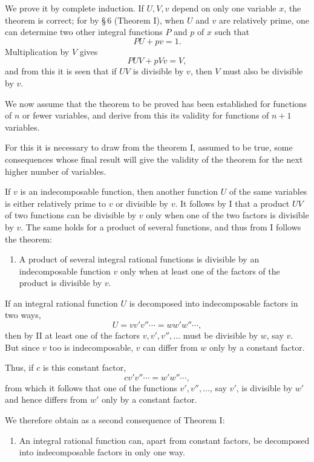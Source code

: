 \documentclass[11pt]{article}
\begin{document}
We prove it by complete induction. If $U,V,v$ depend on only one variable $x$, the theorem is correct; for by \S\,6 (Theorem I), when $U$ and $v$ are relatively prime, one can determine two other integral functions $P$ and $p$ of $x$ such that
\[
PU+pv=1.
\]
Multiplication by $V$ gives
\[
PUV+pVv=V,
\]
and from this it is seen that if $UV$ is divisible by $v$, then $V$ must also be divisible by $v$.

We now assume that the theorem to be proved has been established for functions of $n$ or fewer variables, and derive from this its validity for functions of $n+1$ variables.

For this it is necessary to draw from the theorem I, assumed to be true, some consequences whose final result will give the validity of the theorem for the next higher number of variables.

If $v$ is an indecomposable function, then another function $U$ of the same variables is either relatively prime to $v$ or divisible by $v$. It follows by I that a product $UV$ of two functions can be divisible by $v$ only when one of the two factors is divisible by $v$. The same holds for a product of several functions, and thus from I follows the theorem:

\begin{enumerate}[label=\Roman*.,leftmargin=2.4em,start=2]
\item A product of several integral rational functions is divisible by an indecomposable function $v$ only when at least one of the factors of the product is divisible by $v$.
\end{enumerate}

If an integral rational function $U$ is decomposed into indecomposable factors in two ways,
\[
U=vv'v''\cdots=ww'w''\cdots,
\]
then by II at least one of the factors $v,v',v'',\ldots$ must be divisible by $w$, say $v$. But since $v$ too is indecomposable, $v$ can differ from $w$ only by a constant factor.

Thus, if $c$ is this constant factor,
\[
cv'v''\cdots=w'w''\cdots,
\]
from which it follows that one of the functions $v',v'',\ldots$, say $v'$, is divisible by $w'$ and hence differs from $w'$ only by a constant factor.

We therefore obtain as a second consequence of Theorem I:

\begin{enumerate}[label=\Roman*.,leftmargin=2.4em,start=3]
\item An integral rational function can, apart from constant factors, be decomposed into indecomposable factors in only one way.
\end{enumerate}
\end{document}
